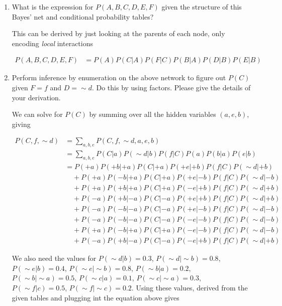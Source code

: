 \documentclass[12pt]{article}
\begin{document}
\begin{enumerate}

\item What is the expression for $P(A,B,C,D,E,F)$ given the structure
  of this Bayes' net and conditional probability tables?

This can be derived by just looking at the parents of each node, only encoding {\em local} interactions

\vspace{-2em}
\begin{align*}
  P(A,B,C,D,E,F) &= P(A)P(C|A)P(F|C)P(B|A)P(D|B)P(E|B)
\end{align*}

\item Perform inference by enumeration on the above network to figure
  out $P(C)$ given $F=f$ and $D= \sim d$.  Do this by using factors.
  Please give the details of your derivation.

  We can solve for $P(C)$ by summing over all the hidden variables $(a,e,b)$, giving

\begin{align*}
  P(C,f, \sim d) &= \sum_{a,b,e}P(C,f,\sim d, a, e, b)\\
                 &= \sum_{a,b,e}P(C|a)P(\sim d | b)P(f|C) P(a) P(b|a) P(e|b)\\
                 &= P(+a)P(+b|+a)P(C|+a)P(+e|+b)P(f|C)P(\sim d|+b)\\
                 &\phantom{aa}+ P(+a)P(-b|+a)P(C|+a)P(+e|-b)P(f|C)P(\sim d|-b)\\
                 &\phantom{aa}+ P(+a)P(+b|+a)P(C|+a)P(-e|+b)P(f|C)P(\sim d|+b)\\
                 &\phantom{aa}+ P(-a)P(+b|-a)P(C|-a)P(+e|+b)P(f|C)P(\sim d|+b)\\
                 &\phantom{aa}+ P(-a)P(-b|-a)P(C|-a)P(+e|-b)P(f|C)P(\sim d|-b)\\
                 &\phantom{aa}+ P(-a)P(-b|-a)P(C|-a)P(-e|-b)P(f|C)P(\sim d|-b)\\
                 &\phantom{aa}+ P(+a)P(-b|+a)P(C|+a)P(-e|-b)P(f|C)P(\sim d|-b)\\
                 &\phantom{aa}+ P(-a)P(+b|-a)P(C|-a)P(-e|+b)P(f|C)P(\sim d|+b)
\end{align*}

We also need the values for $P(\sim d|b) = 0.3$, $P(\sim d | \sim b) = 0.8$, $P(\sim e | b) = 0.4$, $P(\sim e | \sim b) = 0.8$, $P(\sim b | a) = 0.2$, $P(\sim b | \sim a) = 0.5$, $P(\sim c | a) = 0.1$, $P(\sim c | \sim a) = 0.3$, $P(\sim f | c) = 0.5$, $P(\sim f | \sim c) = 0.2$. Using these values, derived from the given tables and plugging int the equation above gives


\end{enumerate}
\end{document}
